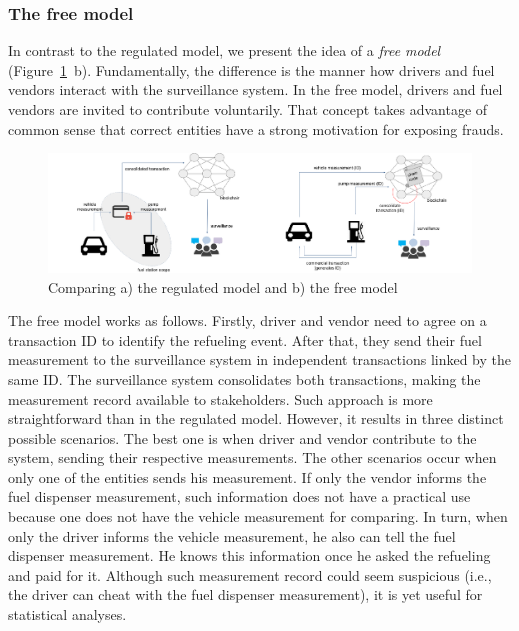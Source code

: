 \documentclass[sigplan]{acmart}
\begin{document}
\subsubsection{The free model}
\label{s:freemodel}
In contrast to the regulated model, we present the idea of a \emph{free model} (Figure~\ref{f:reg-free}~b).
Fundamentally, the difference is the manner how drivers and fuel vendors interact with the surveillance system.
In the free model, drivers and fuel vendors are invited to contribute voluntarily.
That concept takes advantage of common sense that correct entities have a strong motivation for exposing frauds.

\begin{figure}[!t]
\centering
\includegraphics[width=.95\textwidth]{reg-free}
\caption{Comparing a) the regulated model and b) the free model}
\label{f:reg-free}
\end{figure}

The free model works as follows.
Firstly, driver and vendor need to agree on a transaction ID to identify the refueling event. 
After that, they send their fuel measurement to the surveillance system in independent transactions linked by the same ID. 
The surveillance system consolidates both transactions, making the measurement record available to stakeholders.
Such approach is more straightforward than in the regulated model.
However, it results in three distinct possible scenarios.
The best one is when driver and vendor contribute to the system, sending their respective measurements.
The other scenarios occur when only one of the entities sends his measurement.
If only the vendor informs the fuel dispenser measurement, such information does not have a practical use because one does not have the vehicle measurement for comparing.
In turn, when only the driver informs the vehicle measurement, he also can tell the fuel dispenser measurement.
He knows this information once he asked the refueling and paid for it.
Although such measurement record could seem suspicious (i.e., the driver can cheat with the fuel dispenser measurement), it is yet useful for statistical analyses.
\end{document}
